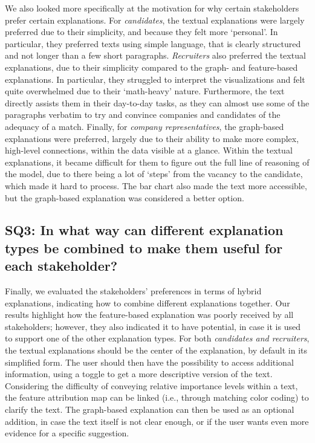 We also looked more specifically at the motivation for why certain stakeholders prefer certain explanations. For \textit{candidates}, the textual explanations were largely preferred due to their simplicity, and because they felt more `personal'. In particular, they preferred texts using simple language, that is clearly structured and not longer than a few short paragraphs. \textit{Recruiters} also preferred the textual explanations, due to their simplicity compared to the graph- and feature-based explanations. In particular, they struggled to interpret the visualizations and felt quite overwhelmed due to their `math-heavy' nature. Furthermore, the text directly assists them in their day-to-day tasks, as they can almost use some of the paragraphs verbatim to try and convince companies and candidates of the adequacy of a match. Finally, for \textit{company representatives}, the graph-based explanations were preferred, largely due to their ability to make more complex, high-level connections, within the data visible at a glance. Within the textual explanations, it became difficult for them to figure out the full line of reasoning of the model, due to there being a lot of `steps' from the vacancy to the candidate, which made it hard to process. The bar chart also made the text more accessible, but the graph-based explanation was considered a better option.

\subsection{SQ3: In what way can different explanation types be combined to make them useful for each stakeholder?}

Finally, we evaluated the stakeholders' preferences in terms of hybrid explanations, indicating how to combine different explanations together. Our results highlight how the feature-based explanation was poorly received by all stakeholders; however, they also indicated it to have potential, in case it is used to support one of the other explanation types. For both \textit{candidates and recruiters}, the textual explanations should be the center of the explanation, by default in its simplified form. The user should then have the possibility to access additional information, using a toggle to get a more descriptive version of the text. Considering the difficulty of conveying relative importance levels within a text, the feature attribution map can be linked (i.e., through matching color coding) to clarify the text. The graph-based explanation can then be used as an optional addition, in case the text itself is not clear enough, or if the user wants even more evidence for a specific suggestion. 

